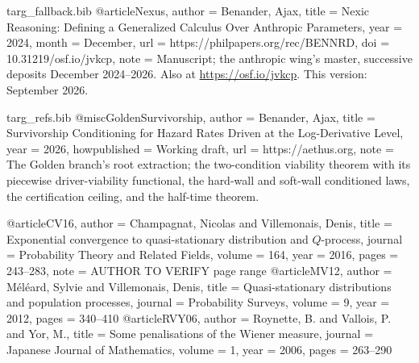\begin{filecontents}[overwrite]{targ_fallback.bib}
@article{Nexus,
  author      = {Benander, Ajax},
  title       = {Nexic Reasoning: Defining a Generalized Calculus Over Anthropic Parameters},
  year        = {2024},
  month       = {December},
  url         = {https://philpapers.org/rec/BENNRD},
  doi         = {10.31219/osf.io/jvkcp},
  note        = {Manuscript; the anthropic wing's master, successive deposits
                 December 2024--2026. Also at \url{https://osf.io/jvkcp}.
                 This version: September 2026.}
}

\end{filecontents}
\begin{filecontents}[overwrite]{targ_refs.bib}
@misc{GoldenSurvivorship,
  author       = {Benander, Ajax},
  title        = {Survivorship Conditioning for Hazard Rates Driven at the Log-Derivative Level},
  year         = {2026},
  howpublished = {Working draft},
  url          = {https://aethus.org},
  note         = {The Golden branch's root extraction; the two-condition viability
                  theorem with its piecewise driver-viability functional, the
                  hard-wall and soft-wall conditioned laws, the certification
                  ceiling, and the half-time theorem.}
}

@article{CV16,
  author  = {Champagnat, Nicolas and Villemonais, Denis},
  title   = {Exponential convergence to quasi-stationary distribution and {$Q$}-process},
  journal = {Probability Theory and Related Fields},
  volume  = {164},
  year    = {2016},
  pages   = {243--283},
  note    = {AUTHOR TO VERIFY page range}
}
@article{MV12,
  author  = {M{\'e}l{\'e}ard, Sylvie and Villemonais, Denis},
  title   = {Quasi-stationary distributions and population processes},
  journal = {Probability Surveys},
  volume  = {9},
  year    = {2012},
  pages   = {340--410}
}
@article{RVY06,
  author  = {Roynette, B. and Vallois, P. and Yor, M.},
  title   = {Some penalisations of the {W}iener measure},
  journal = {Japanese Journal of Mathematics},
  volume  = {1},
  year    = {2006},
  pages   = {263--290}
}
\end{filecontents}
